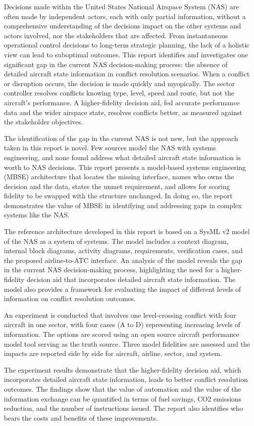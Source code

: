 Decisions made within the United States National Airspace System (NAS) are often made by independent actors, each with only partial information, without a comprehensive understanding of the decisions impact on the other systems and actors involved, nor the stakeholders that are affected. From instantaneous operational control decisions to long-term strategic planning, the lack of a holistic view can lead to suboptimal outcomes. This report identifies and investigates one significant gap in the current NAS decision-making process: the absence of detailed aircraft state information in conflict resolution scenarios. When a conflict or disruption occurs, the decision is made quickly and myopically. The sector controller resolves conflicts knowing type, level, speed and route, but not the aircraft's performance. A higher-fidelity decision aid, fed accurate performance data and the wider airspace state, resolves conflicts better, as measured against the stakeholder objectives.

The identification of the gap in the current NAS is not new, but the approach taken in this report is novel. Few sources model the NAS with systems engineering, and none found address what detailed aircraft state information is worth to NAS decisions. This report presents a model-based systems engineering (MBSE) architecture that locates the missing interface, names who owns the decision and the data, states the unmet requirement, and allows for scoring fidelity to be swapped with the structure unchanged. In doing so, the report demonstrates the value of MBSE in identifying and addressing gaps in complex systems like the NAS.

The reference architecture developed in this report is based on a SysML v2 model of the NAS as a system of systems. The model includes a context diagram, internal block diagrams, activity diagrams, requirements, verification cases, and the proposed airline-to-ATC interface. An analysis of the model reveals the gap in the current NAS decision-making process, highlighting the need for a higher-fidelity decision aid that incorporates detailed aircraft state information. The model also provides a framework for evaluating the impact of different levels of information on conflict resolution outcomes.

An experiment is conducted that involves one level-crossing conflict with four aircraft in one sector, with four cases (A to D) representing increasing levels of information. The options are scored using an open source aircraft performance model tool serving as the truth source. Three model fidelities are assessed and the impacts are reported side by side for aircraft, airline, sector, and system.

The experiment results demonstrate that the higher-fidelity decision aid, which incorporates detailed aircraft state information, leads to better conflict resolution outcomes. The findings show that the value of automation and the value of the information exchange can be quantified in terms of fuel savings, CO2 emissions reduction, and the number of instructions issued. The report also identifies who bears the costs and benefits of these improvements.

